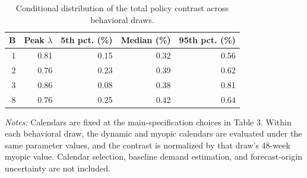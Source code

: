 \begin{table}
\centering
\caption{Conditional distribution of the total policy contrast across behavioral draws.}
\label{tab:behavioral_uncertainty}
\begin{tabular}{rrrrr}
\toprule
B & Peak $\lambda$ & 5th pct. (\%) & Median (\%) & 95th pct. (\%) \\
\midrule
1 & 0.81 & 0.15 & 0.32 & 0.56 \\
2 & 0.76 & 0.23 & 0.39 & 0.62 \\
3 & 0.86 & 0.08 & 0.38 & 0.81 \\
8 & 0.76 & 0.25 & 0.42 & 0.64 \\
\bottomrule
\end{tabular}
\smallskip
\footnotesize\emph{Notes:} Calendars are fixed at the main-specification choices in Table 3. Within each behavioral draw, the dynamic and myopic calendars are evaluated under the same parameter values, and the contrast is normalized by that draw's 48-week myopic value. Calendar selection, baseline demand estimation, and forecast-origin uncertainty are not included.
\end{table}
